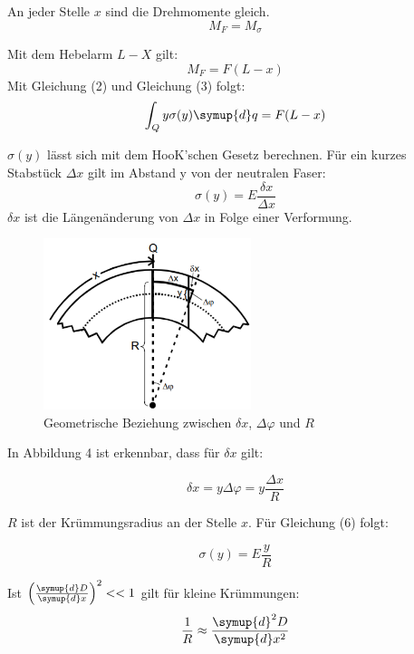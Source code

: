 An jeder Stelle $x$ sind die Drehmomente gleich.
\begin{equation}
  M_F =M_{\sigma}
\end{equation}

Mit dem Hebelarm $L-X$ gilt:
\begin{equation}
  M_F = F(L - x)
\end{equation}
Mit Gleichung (2) und Gleichung (3) folgt:
\begin{equation}
  \int_Q y \sigma(y) \symup{d}q = F(L - x)
\end{equation}

$\sigma (y)$ lässt sich mit dem HooK'schen Gesetz berechnen.
Für ein kurzes Stabstück $\Delta x$ gilt im Abstand y von der neutralen Faser:
\begin{equation}
  \sigma (y) = E \frac{\delta x}{\Delta x}
\end{equation}
$\delta x$ ist die Längenänderung von $\Delta x$ in Folge einer Verformung.

\begin{figure}[H]
  \centering
  \includegraphics[height=5cm]{deltax.PNG}
  \caption{Geometrische Beziehung zwischen $\delta x$, $\Delta\varphi$ und $R$}
  \label{fig:deltax}
\end{figure}

In Abbildung 4 ist erkennbar, dass für $\delta x$ gilt:

\begin{equation}
  \delta x = y \Delta \varphi = y \frac{\Delta x}{R}
\end{equation}

$R$ ist der Krümmungsradius an der Stelle $x$. Für Gleichung (6) folgt:

\begin{equation}
  \sigma (y) = E \frac{y}{R}
\end{equation}

Ist $\left(\frac{\symup{d} D}{\symup{d} x}\right)^2 << 1$ gilt für kleine Krümmungen:
\begin{equation}
  \frac{1}{R} \approx \frac{\symup{d}^2 D}{\symup{d} x^2}
\end{equation}

